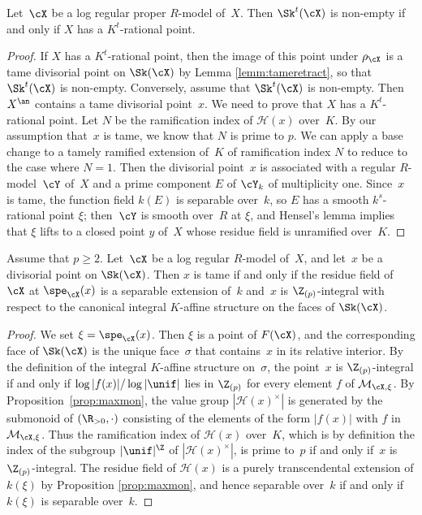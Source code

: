 \begin{prop}\label{prop:nonempty}
Let~$\cX$ be a log regular proper $R$\nobreakdash-model of~$X$. Then $\Sk^t(\cX)$ is non-empty if and only if $X$ has a $K^t$-rational point.
\end{prop}
\begin{proof}
If $X$ has a $K^t$-rational point, then the image of this point under $\rho_{\cX}$ is a tame divisorial point on $\Sk(\cX)$ by Lemma \ref{lemm:tameretract}, so that $\Sk^t(\cX)$ is non-empty.
Conversely, assume that $\Sk^t(\cX)$ is non-empty. Then
$X^{\an}$ contains a tame divisorial point~$x$.
We need to prove that $X$ has a $K^t$-rational point. Let $N$ be the ramification index of $\mathscr{H}(x)$ over~$K$. By our assumption that~$x$ is tame, we know that $N$ is prime to $p$. We can apply a base change to a tamely ramified extension of~$K$ of ramification index $N$ to reduce to the case where $N=1$.
Then the divisorial point~$x$ is associated with
a regular $R$\nobreakdash-model~$\cY$ of~$X$ and a prime component $E$ of $\cY_k$ of multiplicity one.
Since~$x$ is tame, the function field $k(E)$ is separable over~$k$, so $E$ has a smooth $k^s$-rational point $\xi$; then~$\cY$ is smooth over~$R$ at $\xi$, and Hensel's lemma implies that $\xi$ lifts to a closed point $y$ of~$X$ whose residue field is unramified over~$K$.
\end{proof}

\begin{prop}\label{prop:tame}
Assume that $p\geq 2$.
Let~$\cX$ be a log regular $R$\nobreakdash-model of~$X$, and let~$x$ be a divisorial point on $\Sk(\cX)$. Then
$x$ is tame if and only if the residue field of~$\cX$ at $\spe_{\cX}(x)$ is a separable extension of~$k$ and~$x$ is $\Z_{(p)}$-integral with respect to the canonical integral $K$\nobreakdash-affine structure on the faces of $\Sk(\cX)$.
\end{prop}
\begin{proof}
We set $\xi=\spe_{\cX}(x)$. Then $\xi$ is a point of $F(\cX)$, and the corresponding face of $\Sk(\cX)$ is the unique face~$\sigma$ that contains~$x$ in its relative interior. By the definition of the integral $K$\nobreakdash-affine structure on~$\sigma$, the point~$x$ is $\Z_{(p)}$-integral if and only if $\log |f(x)|/\log |\unif|$ lies in $\Z_{(p)}$ for every element $f$ of $\mathcal{M}_{\cX,\xi}$. By Proposition~\ref{prop:maxmon}, the value group $|\mathscr{H}(x)^{\times}|$ is generated by the submonoid of $(\R_{>0},\cdot)$ consisting of the elements of the form $|f(x)|$ with $f$ in $\mathcal{M}_{\cX,\xi}$.
Thus the ramification index of $\mathscr{H}(x)$ over~$K$, which is by definition the index of the subgroup $|\unif|^{\Z}$ of $|\mathscr{H}(x)^{\times}|$, is prime to~$p$ if and only if~$x$ is $\Z_{(p)}$-integral.
The residue field of $\mathscr{H}(x)$ is a purely transcendental extension of $k(\xi)$ by Proposition \ref{prop:maxmon}, and hence separable over~$k$ if and only if $k(\xi)$ is separable over~$k$.
\end{proof}

